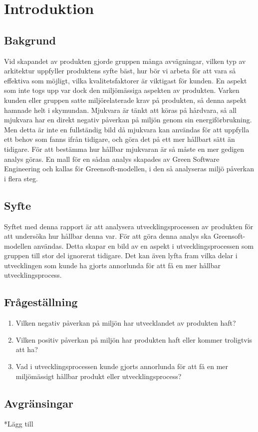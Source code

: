 \section{Introduktion}
\label{sec:joel_a-introduction}

\subsection{Bakgrund}
Vid skapandet av produkten gjorde gruppen många avvägningar, vilken typ av arkitektur uppfyller produktens syfte bäst, hur bör vi arbeta för att vara så effektiva som möjligt, vilka kvalitetsfaktorer är viktigast för kunden. En aspekt som inte togs upp var dock den miljömässiga aspekten av produkten. Varken kunden eller gruppen satte miljörelaterade krav på produkten, så denna aspekt hamnade helt i skymundan. Mjukvara är tänkt att köras på hårdvara, så all mjukvara har en direkt negativ påverkan på miljön genom sin energiförbrukning. Men detta är inte en fullständig bild då mjukvara kan användas för att uppfylla ett behov som fanns ifrån tidigare, och göra det på ett mer hållbart sätt än tidigare. För att bestämma hur hållbar mjukvaran är så måste en mer gedigen analys göras. En mall för en sådan analys skapades av Green Software Engineering och kallas för Greensoft-modellen\cite{greensoft}, i den så analyseras miljö påverkan i flera steg.

\subsection{Syfte}
Syftet med denna rapport är att analysera utvecklingsprocessen av produkten för att undersöka hur hållbar denna var. För att göra denna analys ska Greensoft-modellen användas. Detta skapar en bild av en aspekt i utvecklingsprocessen som gruppen till stor del ignorerat tidigare. Det kan även lyfta fram vilka delar i utvecklingen som kunde ha gjorts annorlunda för att få en mer hållbar utvecklingsprocess.

\subsection{Frågeställning}
\label{subsec:joel_a-research-questions}

\begin{enumerate}
\item Vilken negativ påverkan på miljön har utvecklandet av produkten haft?

\item Vilken positiv påverkan på miljön har produkten haft eller kommer troligtvis att ha?

\item Vad i utvecklingsprocessen kunde gjorts annorlunda för att få en mer miljömässigt hållbar produkt eller utvecklingsprocess?

\end{enumerate}

\subsection{Avgränsingar}
\label{subsec:joel_a-delimitations}

*Lägg till